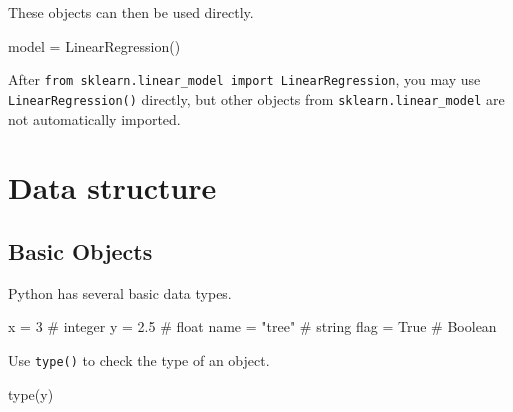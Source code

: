 \documentclass[
  letterpaper,
  DIV=11,
  numbers=noendperiod]{scrreprt}
\newenvironment{Shaded}{\begin{snugshade}}{\end{snugshade}}
\newcommand{\BuiltInTok}[1]{\textcolor[rgb]{0.00,0.23,0.31}{#1}}
\newcommand{\CommentTok}[1]{\textcolor[rgb]{0.37,0.37,0.37}{#1}}
\newcommand{\DecValTok}[1]{\textcolor[rgb]{0.68,0.00,0.00}{#1}}
\newcommand{\FloatTok}[1]{\textcolor[rgb]{0.68,0.00,0.00}{#1}}
\newcommand{\NormalTok}[1]{\textcolor[rgb]{0.00,0.23,0.31}{#1}}
\newcommand{\OperatorTok}[1]{\textcolor[rgb]{0.37,0.37,0.37}{#1}}
\newcommand{\StringTok}[1]{\textcolor[rgb]{0.13,0.47,0.30}{#1}}
\newcommand{\VariableTok}[1]{\textcolor[rgb]{0.07,0.07,0.07}{#1}}
\theoremstyle{definition}
\theoremstyle{definition}
\theoremstyle{plain}
\theoremstyle{plain}
\theoremstyle{remark}
\begin{document}
These objects can then be used directly.

\begin{Shaded}
\begin{Highlighting}[]
\NormalTok{model }\OperatorTok{=}\NormalTok{ LinearRegression()}
\end{Highlighting}
\end{Shaded}

\begin{tcolorbox}[enhanced jigsaw, arc=.35mm, bottomrule=.15mm, bottomtitle=1mm, breakable, colback=white, colbacktitle=quarto-callout-note-color!10!white, colframe=quarto-callout-note-color-frame, coltitle=black, left=2mm, leftrule=.75mm, opacityback=0, opacitybacktitle=0.6, rightrule=.15mm, title=\textcolor{quarto-callout-note-color}{\faInfo}\hspace{0.5em}{Note}, titlerule=0mm, toprule=.15mm, toptitle=1mm]

After \texttt{from\ sklearn.linear\_model\ import\ LinearRegression},
you may use \texttt{LinearRegression()} directly, but other objects from
\texttt{sklearn.linear\_model} are not automatically imported.

\end{tcolorbox}

\section{Data structure}\label{data-structure}

\subsection{Basic Objects}\label{basic-objects}

Python has several basic data types.

\begin{Shaded}
\begin{Highlighting}[]
\NormalTok{x }\OperatorTok{=} \DecValTok{3}          \CommentTok{\# integer}
\NormalTok{y }\OperatorTok{=} \FloatTok{2.5}        \CommentTok{\# float}
\NormalTok{name }\OperatorTok{=} \StringTok{"tree"}  \CommentTok{\# string}
\NormalTok{flag }\OperatorTok{=} \VariableTok{True}    \CommentTok{\# Boolean}
\end{Highlighting}
\end{Shaded}

Use \texttt{type()} to check the type of an object.

\begin{Shaded}
\begin{Highlighting}[]
\BuiltInTok{type}\NormalTok{(y)}
\end{Highlighting}
\end{Shaded}
\end{document}
